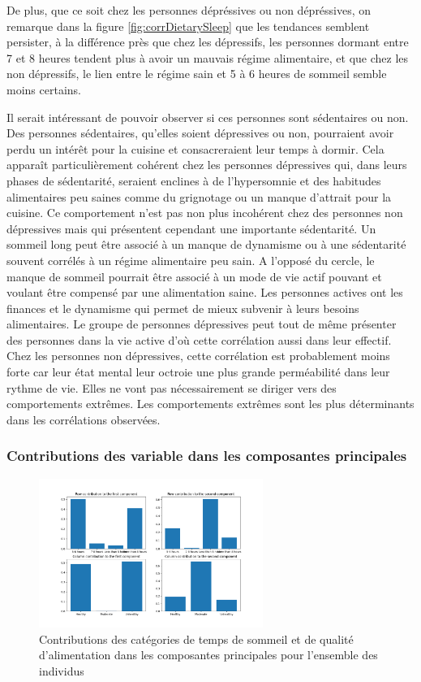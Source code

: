 De plus, que ce soit chez les personnes dépréssives ou non dépréssives, on remarque dans la figure \ref{fig:corrDietarySleep} que les tendances semblent persister, à la différence près que chez les dépressifs, les personnes dormant entre 7 et 8 heures tendent plus à avoir un mauvais régime alimentaire, et que chez les non dépressifs, le lien entre le régime sain et 5 à 6 heures de sommeil semble moins certains. 

Il serait intéressant de pouvoir observer si ces personnes sont sédentaires ou non. 
Des personnes sédentaires, qu’elles soient dépressives ou non, pourraient avoir perdu un intérêt pour la cuisine et consacreraient leur temps à dormir. Cela apparaît particulièrement cohérent chez les personnes dépressives qui, dans leurs phases de sédentarité, seraient enclines à de l’hypersomnie et des habitudes alimentaires peu saines comme du grignotage ou un manque d’attrait pour la cuisine. Ce comportement n’est pas non plus incohérent chez des personnes non dépressives mais qui présentent cependant une importante sédentarité. Un sommeil long peut être associé à un manque de dynamisme ou à une sédentarité souvent corrélés à un régime alimentaire peu sain.
A l’opposé du cercle, le manque de sommeil pourrait être associé à un mode de vie actif pouvant et voulant être compensé par une alimentation saine. Les personnes actives ont les finances et le dynamisme qui permet de mieux subvenir à leurs besoins alimentaires. Le groupe de personnes dépressives peut tout de même présenter des personnes dans la vie active d’où cette corrélation aussi dans leur effectif. Chez les personnes non dépressives, cette corrélation est probablement moins forte car leur état mental leur octroie une plus grande perméabilité dans leur rythme de vie. Elles ne vont pas nécessairement se diriger vers des comportements extrêmes.
Les comportements extrêmes sont les plus déterminants dans les corrélations observées.

\subsubsection{Contributions des variable dans les composantes principales}

\begin{figure}[H]
  \begin{center}
    \includegraphics[width=0.65\textwidth]{Images/Sleep_Dietary_all/RowColumnsContributions.png}
  \end{center}
  \caption{Contributions des catégories de temps de sommeil et de qualité d'alimentation dans les composantes principales pour l'ensemble des individus}
  \label{fig:contribSleepDietaryAll}
\end{figure}

